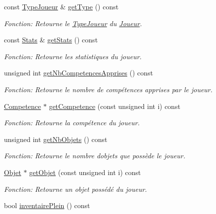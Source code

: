 \begin{DoxyCompactItemize}
const \mbox{\hyperlink{structTypeJoueur}{Type\+Joueur}} \& \mbox{\hyperlink{classJoueur_a07800b7930b339f789a4e0d9a9ef220f}{get\+Type}} () const
\begin{DoxyCompactList}\small\item\em Fonction\+: Retourne le \mbox{\hyperlink{structTypeJoueur}{Type\+Joueur}} du \mbox{\hyperlink{classJoueur}{Joueur}}. \end{DoxyCompactList}\item 
const \mbox{\hyperlink{structStats}{Stats}} \& \mbox{\hyperlink{classJoueur_af606e8696fe13a8d974fa82807b13c61}{get\+Stats}} () const
\begin{DoxyCompactList}\small\item\em Fonction\+: Retourne les statistiques du joueur. \end{DoxyCompactList}\item 
unsigned int \mbox{\hyperlink{classJoueur_adc1402a249ac134756268bb3590677c5}{get\+Nb\+Competences\+Apprises}} () const
\begin{DoxyCompactList}\small\item\em Fonction\+: Retourne le nombre de compétences apprises par le joueur. \end{DoxyCompactList}\item 
\mbox{\hyperlink{structCompetence}{Competence}} $\ast$ \mbox{\hyperlink{classJoueur_a16549832c2daff14fc2b51ecdc3e15ee}{get\+Competence}} (const unsigned int i) const
\begin{DoxyCompactList}\small\item\em Fonction\+: Retourne la compétence du joueur. \end{DoxyCompactList}\item 
unsigned int \mbox{\hyperlink{classJoueur_a2e4f88f534715188f19d35d1f72c1a44}{get\+Nb\+Objets}} () const
\begin{DoxyCompactList}\small\item\em Fonction\+: Retourne le nombre d\textquotesingle{}objets que possède le joueur. \end{DoxyCompactList}\item 
\mbox{\hyperlink{structObjet}{Objet}} $\ast$ \mbox{\hyperlink{classJoueur_ac9530c324c6dff323138e00b933eb448}{get\+Objet}} (const unsigned int i) const
\begin{DoxyCompactList}\small\item\em Fonction\+: Retourne un objet possédé du joueur. \end{DoxyCompactList}\item 
bool \mbox{\hyperlink{classJoueur_ac1ed6a6c64897d04401117fe9ed4a3a3}{inventaire\+Plein}} () const

\end{DoxyCompactItemize}
